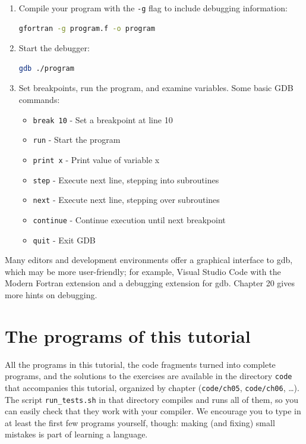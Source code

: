 \begin{enumerate}
    \item Compile your program with the \texttt{-g} flag to include debugging information:
    \begin{lstlisting}[language=bash]
gfortran -g program.f -o program
    \end{lstlisting}
    
    \item Start the debugger:
    \begin{lstlisting}[language=bash]
gdb ./program
    \end{lstlisting}
    
    \item Set breakpoints, run the program, and examine variables. Some basic GDB commands:
    \begin{itemize}
        \item \texttt{break 10} - Set a breakpoint at line 10
        \item \texttt{run} - Start the program
        \item \texttt{print x} - Print value of variable x
        \item \texttt{step} - Execute next line, stepping into subroutines
        \item \texttt{next} - Execute next line, stepping over subroutines
        \item \texttt{continue} - Continue execution until next breakpoint
        \item \texttt{quit} - Exit GDB
    \end{itemize}
\end{enumerate}

Many editors and development environments offer a graphical interface to gdb, which may be more user-friendly; for example, Visual Studio Code with the Modern Fortran extension and a debugging extension for gdb. Chapter 20 gives more hints on debugging.

\section{The programs of this tutorial}

All the programs in this tutorial, the code fragments turned into complete programs, and the solutions to the exercises are available in the directory \texttt{code} that accompanies this tutorial, organized by chapter (\texttt{code/ch05}, \texttt{code/ch06}, \ldots). The script \texttt{run\_tests.sh} in that directory compiles and runs all of them, so you can easily check that they work with your compiler. We encourage you to type in at least the first few programs yourself, though: making (and fixing) small mistakes is part of learning a language.

